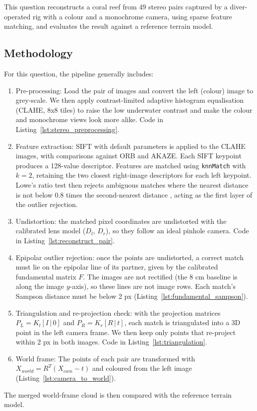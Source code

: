 \documentclass[12pt]{article}
\begin{document}
This question reconstructs a coral reef from 49 stereo pairs captured by a diver-operated rig with a colour and a monochrome camera, using sparse feature matching, and evaluates the result against a reference terrain model.

\subsection{Methodology}
For this question, the pipeline generally includes: 
\begin{enumerate}
    \item Pre-processing: Load the pair of images and convert the left (colour) image to grey-scale. We then apply contrast-limited adaptive histogram equalisation (CLAHE, 8x8 tiles) \cite{zuiderveld1994clahe} to raise the low underwater contrast and make the colour and monochrome views look more alike. Code in Listing~\ref{lst:stereo_preprocessing}.
    \item Feature extraction: SIFT with default parameters is applied to the CLAHE images, with comparisons against ORB and AKAZE. Each SIFT keypoint produces a 128-value descriptor. Features are matched using \texttt{knnMatch} with $k=2$, retaining the two closest right-image descriptors for each left keypoint. Lowe's ratio test then rejects ambiguous matches where the nearest distance is not below $0.8$ times the second-nearest distance \cite{lowe2004distinctive}, acting as the first layer of the outlier rejection.
    \item Undistortion: the matched pixel coordinates are undistorted with the calibrated lens model ($D_l$, $D_r$), so they follow an ideal pinhole camera. Code in Listing~\ref{lst:reconstruct_pair}.
    \item Epipolar outlier rejection: once the points are undistorted, a correct match must lie on the epipolar line of its partner, given by the calibrated fundamental matrix $F$. The images are not rectified (the 8 cm baseline is along the image $y$-axis), so these lines are not image rows. Each match's Sampson distance must be below 2 px (Listing~\ref{lst:fundamental_sampson}).
    \item Triangulation and re-projection check: with the projection matrices $P_L = K_l[I\,|\,0]$ and $P_R = K_r[R\,|\,t]$, each match is triangulated into a 3D point in the left camera frame. We then keep only points that re-project within 2 px in both images. Code in Listing~\ref{lst:triangulation}.
    \item World frame: The points of each pair are transformed with \(X_{world} = R^T(X_{cam} - t)\) and coloured from the left image (Listing~\ref{lst:camera_to_world}).
\end{enumerate}
The merged world-frame cloud is then compared with the reference terrain model.
\end{document}
